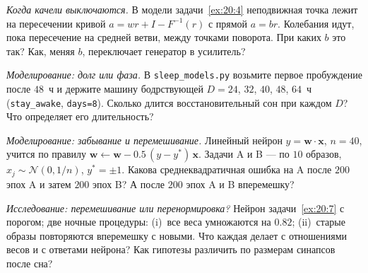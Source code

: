 \begin{exercise}[\lvlB]
\label{ex:20:5}
\emph{Когда качели выключаются.} В модели задачи~\ref{ex:20:4} неподвижная точка лежит на пересечении кривой $a=wr+I-F^{-1}(r)$ с прямой $a=br$. Колебания идут, пока пересечение на средней ветви, между точками поворота. При каких $b$ это так? Как, меняя $b$,  переключает генератор в усилитель?
\end{exercise}

\begin{exercise}[\lvlB]
\label{ex:20:6}
\emph{Моделирование: долг или фаза.} В \texttt{sleep\_models.py} возьмите первое пробуждение после $48$~ч и держите машину бодрствующей $D=24$, $32$, $40$, $48$, $64$~ч (\texttt{stay\_awake}, \texttt{days=8}). Сколько длится восстановительный сон при каждом $D$? Что определяет его длительность?
\end{exercise}

\begin{exercise}[\lvlB]
\label{ex:20:7}
\emph{Моделирование: забывание и перемешивание.} Линейный нейрон $y=\mathbf w\cdot\mathbf x$, $n=40$, учится по правилу $\mathbf w\leftarrow\mathbf w-0.5\,(y-y^*)\,\mathbf x$. Задачи A и B --- по $10$ образов, $x_j\sim\mathcal N(0,1/n)$, $y^*=\pm1$. Какова среднеквадратичная ошибка на A после $200$ эпох A и затем $200$ эпох B? А после $200$ эпох A и B вперемешку?
\end{exercise}

\begin{exercise}[\lvlC]
\label{ex:20:8}
\emph{Исследование: перемешивание или перенормировка?} Нейрон задачи~\ref{ex:20:7} с порогом; две ночные процедуры: (i)~все веса умножаются на $0.82$; (ii)~старые образы повторяются вперемешку с новыми. Что каждая делает с отношениями весов и с ответами нейрона? Как гипотезы различить по размерам синапсов после сна?
\end{exercise}
